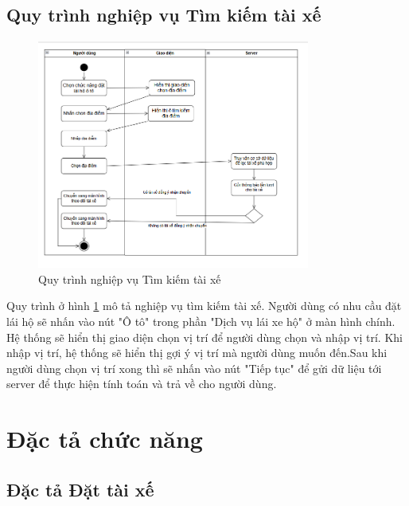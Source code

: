 \documentclass[../DoAn.tex]{subfiles}
\begin{document}
\subsection{Quy trình nghiệp vụ Tìm kiếm tài xế}
\label{subsection:2.3.1}
\begin{figure}[H]
  \centering
  \includegraphics[width=0.8\textwidth]{Hinhve/quy_trinh_nghiep_vu_tim_kiem_tai_xe.png}
  \caption{Quy trình nghiệp vụ Tìm kiếm tài xế}
  \label{fig:quy_trinh_nghiep_vu_tim_kiem_tai_xe}
\end{figure}
Quy trình ở hình \ref{fig:quy_trinh_nghiep_vu_tim_kiem_tai_xe} mô tả nghiệp vụ tìm kiếm tài xế.
Người dùng có nhu cầu đặt lái hộ sẽ nhấn vào nút "Ô tô" trong phần "Dịch vụ lái xe hộ"
ở màn hình chính. Hệ thống sẽ hiển thị giao diện chọn vị trí để người
dùng chọn và nhập vị trí. Khi nhập vị trí, hệ thống sẽ hiển thị gợi ý vị
trí mà người dùng muốn đến.Sau khi người dùng chọn vị trí xong thì sẽ nhấn vào nút "Tiếp tục" để gửi 
dữ liệu tới server để thực hiện tính toán và trả về cho người dùng.


\section{Đặc tả chức năng}
\label{section:2.4}
\subsection{Đặc tả Đặt tài xế}
\label{subsection:2.4.1}
\end{document}
